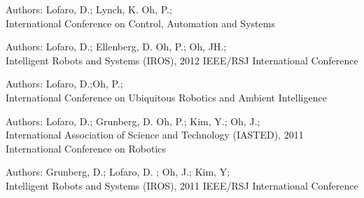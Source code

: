 \begin{resume}
\begin{position}
Authors: Lofaro, D.; Lynch, K. Oh, P.;\\
International Conference on Control, Automation and Systems
\end{position}




\begin{position}
Authors: Lofaro, D.; Ellenberg, D. Oh, P.; Oh, JH.;\\
Intelligent Robots and Systems (IROS), 2012 IEEE/RSJ International Conference
\end{position}

\begin{position}
Authors: Lofaro, D.;Oh, P.;\\
International Conference on Ubiquitous Robotics and Ambient Intelligence
\end{position}





\begin{position}
Authors: Lofaro, D.; Grunberg, D. Oh, P.; Kim, Y.; Oh, J.;\\
International Association of Science and Technology (IASTED), 2011\\ 
International Conference on Robotics
\end{position}


\begin{position}
Authors: Grunberg, D.; Lofaro, D. ; Oh, J.; Kim, Y;\\
Intelligent Robots and Systems (IROS), 2011 IEEE/RSJ International Conference
\end{position}



\end{resume}

